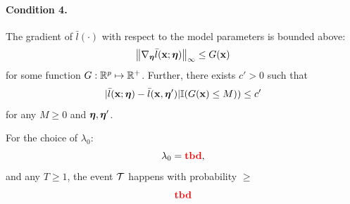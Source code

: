 \documentclass[11pt,letterpaper]{article}
\DeclareMathOperator*{\rtbd}{{\colrbf tbd}}
\numberwithin{equation}{section}
\begin{document}
\paragraph{Condition 4.} The gradient of $\bar l(\cdot)$ with respect to the model parameters is bounded above:
%
$$
\left\| \nabla_{\boldsymbol{\eta}} \bar l({\bf{x}}; {\boldsymbol{\eta}}) \right\|_\infty \leq G({\bf{x}})
$$
%
for some function $G: {\mathbb{R}}^p \mapsto {\mathbb{R}}^+$. Further, there exists $c' > 0$ such that
%
$$
| \bar l({\bf{x}}; {\boldsymbol{\eta}}) - \bar l({\bf{x}}, {\boldsymbol{\eta}}')| {\mathbb{I}}(G({\bf{x}}) \leq M)) \leq c'
$$
%
for any $M \geq 0$ and ${\boldsymbol{\eta}}, {\boldsymbol{\eta}}'$.

\begin{Theorem}\label{thm:thm2}
For the choice of $\lambda_0$:
%
$$
\lambda_0 = \rtbd,
$$
%
and any $T \geq 1$, the event ${\cal{T}}$ happens with probability $\geq$
%
$$
\rtbd
$$
\end{Theorem}
\end{document}
